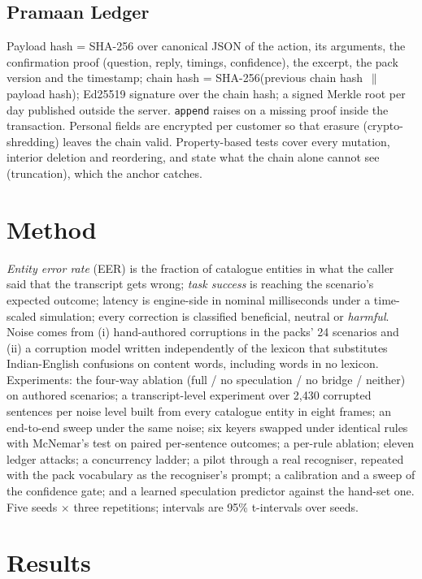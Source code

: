 \documentclass[conference]{IEEEtran}
\begin{document}
\subsection{Pramaan Ledger}

Payload hash = SHA-256 over canonical JSON of the action, its arguments, the confirmation proof (question, reply, timings, confidence), the excerpt, the pack version and the timestamp; chain hash = SHA-256(previous chain hash $\,\|\,$ payload hash); Ed25519 signature over the chain hash; a signed Merkle root per day published outside the server. \texttt{append} raises on a missing proof inside the transaction. Personal fields are encrypted per customer so that erasure (crypto-shredding) leaves the chain valid. Property-based tests cover every mutation, interior deletion and reordering, and state what the chain alone cannot see (truncation), which the anchor catches.

\section{Method}

\emph{Entity error rate} (EER) is the fraction of catalogue entities in what the caller said that the transcript gets wrong; \emph{task success} is reaching the scenario's expected outcome; latency is engine-side in nominal milliseconds under a time-scaled simulation; every correction is classified beneficial, neutral or \emph{harmful}. Noise comes from (i) hand-authored corruptions in the packs' 24 scenarios and (ii) a corruption model written independently of the lexicon that substitutes Indian-English confusions on content words, including words in no lexicon. Experiments: the four-way ablation (full / no speculation / no bridge / neither) on authored scenarios; a transcript-level experiment over 2,430 corrupted sentences per noise level built from every catalogue entity in eight frames; an end-to-end sweep under the same noise; six keyers swapped under identical rules with McNemar's test on paired per-sentence outcomes; a per-rule ablation; eleven ledger attacks; a concurrency ladder; a pilot through a real recogniser, repeated with the pack vocabulary as the recogniser's prompt; a calibration and a sweep of the confidence gate; and a learned speculation predictor against the hand-set one. Five seeds $\times$ three repetitions; intervals are 95\% t-intervals over seeds.

\section{Results}
\end{document}
